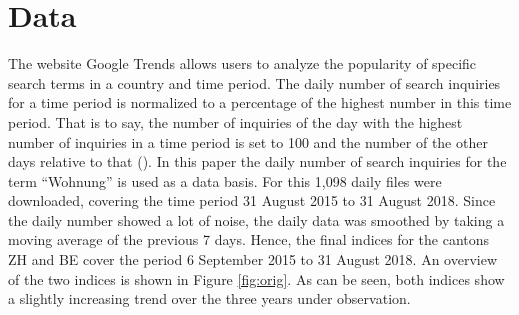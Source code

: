 \documentclass[11pt]{article}
\begin{document}
\section{Data}
The website Google Trends allows users to analyze the popularity of specific search terms in a country and time period. The daily number of search inquiries for a time period is normalized to a percentage of the highest number in this time period. That is to say, the number of inquiries of the day with the highest number of inquiries in a time period is set to 100 and the number of the other days relative to that (\cite{googleT}). In this paper the daily number of search inquiries for the term ``Wohnung'' is used as a data basis. For this 1,098 daily files were downloaded, covering the time period 31 August 2015 to
31 August 2018. Since the daily number showed a lot of noise, the daily data was smoothed by taking a moving average of the previous 7 days. Hence, the final indices for the cantons ZH and BE cover the period 6 September 2015 to 31 August 2018. An overview of the two indices is shown in Figure \ref{fig:orig}. As can be seen, both indices show a slightly increasing trend over the three years under observation.
\end{document}
